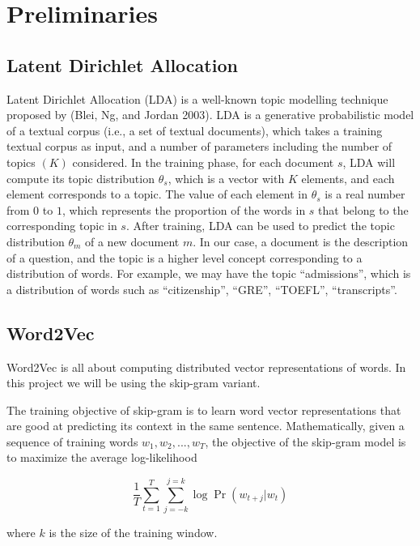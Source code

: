 \section{Preliminaries}\label{preliminaries}

\subsection{Latent Dirichlet
Allocation}\label{latent-dirichlet-allocation}

Latent Dirichlet Allocation (LDA) is a well-known topic modelling
technique proposed by (Blei, Ng, and Jordan 2003). LDA is a generative
probabilistic model of a textual corpus (i.e., a set of textual
documents), which takes a training textual corpus as input, and a number
of parameters including the number of topics \((K)\) considered. In the
training phase, for each document \(s\), LDA will compute its topic
distribution \(\theta_s\), which is a vector with \(K\) elements, and
each element corresponds to a topic. The value of each element in
\(\theta_s\) is a real number from \(0\) to \(1\), which represents the
proportion of the words in \(s\) that belong to the corresponding topic
in \(s\). After training, LDA can be used to predict the topic
distribution \(\theta_m\) of a new document \(m\). In our case, a
document is the description of a question, and the topic is a higher
level concept corresponding to a distribution of words. For example, we
may have the topic ``admissions'', which is a distribution of words such
as ``citizenship'', ``GRE'', ``TOEFL'', ``transcripts''.

\subsection{Word2Vec}\label{word2vec}

Word2Vec is all about computing distributed vector representations of
words. In this project we will be using the skip-gram variant.

The training objective of skip-gram is to learn word vector
representations that are good at predicting its context in the same
sentence. Mathematically, given a sequence of training words
\(w_1,w_2,...,w_T\), the objective of the skip-gram model is to maximize
the average log-likelihood

\[ \frac{1}{T}\sum_{t=1}^T\sum_{j=-k}^{j=k} \log \Pr(w_{t+j} | w_t) \]

where \(k\) is the size of the training window.

